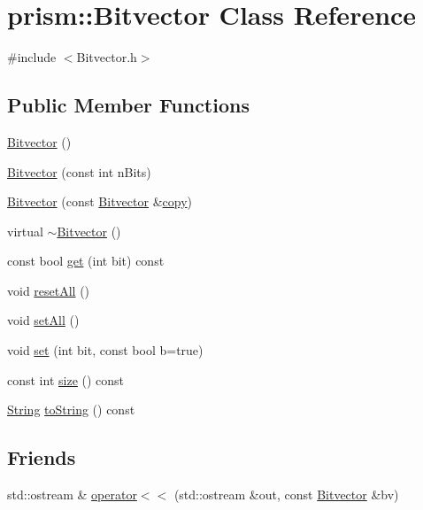 \hypertarget{classprism_1_1_bitvector}{}\section{prism\+:\+:Bitvector Class Reference}
\label{classprism_1_1_bitvector}


{\ttfamily \#include $<$Bitvector.\+h$>$}

\subsection*{Public Member Functions}
\begin{DoxyCompactItemize}
\item 
\hyperlink{classprism_1_1_bitvector_a41d5de4bbd7bf193121a1614cf6b3b3b}{Bitvector} ()
\item 
\hyperlink{classprism_1_1_bitvector_ae2c403debb39b93d7de3317deb0daeeb}{Bitvector} (const int n\+Bits)
\item 
\hyperlink{classprism_1_1_bitvector_a9b0b8f78113cbce3082f2c67fb702a6c}{Bitvector} (const \hyperlink{classprism_1_1_bitvector}{Bitvector} \&\hyperlink{namespaceprism_ae776f4cd825f79e7af1cf6ee1d90a209}{copy})
\item 
virtual \hyperlink{classprism_1_1_bitvector_ac68d7732ae33ccded5b5ef5971280c6d}{$\sim$\+Bitvector} ()
\item 
const bool \hyperlink{classprism_1_1_bitvector_a0a3d203905a1125a2afbdd928997dbe2}{get} (int bit) const 
\item 
void \hyperlink{classprism_1_1_bitvector_abdf123d4a94086c5525ce7d8eed8a6e3}{reset\+All} ()
\item 
void \hyperlink{classprism_1_1_bitvector_aaa4362884a96b180fd45dd261423a7e3}{set\+All} ()
\item 
void \hyperlink{classprism_1_1_bitvector_af6dd4b91e57bb6a95f30c55fdb1ce6a5}{set} (int bit, const bool b=true)
\item 
const int \hyperlink{classprism_1_1_bitvector_aefc31462d8a52013191e0df4f45ccae4}{size} () const 
\item 
\hyperlink{classprism_1_1_string}{String} \hyperlink{classprism_1_1_bitvector_a2639e8ad277f15e545e2ec78db17ab4c}{to\+String} () const 
\end{DoxyCompactItemize}
\subsection*{Friends}
\begin{DoxyCompactItemize}
\item 
std\+::ostream \& \hyperlink{classprism_1_1_bitvector_a5082ad1e850f0d821b1310ab1ff1dc60}{operator$<$$<$} (std\+::ostream \&out, const \hyperlink{classprism_1_1_bitvector}{Bitvector} \&bv)
\end{DoxyCompactItemize}



